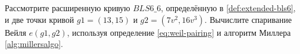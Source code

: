 \begin{exercise}
\label{ex:generator-pairing}
Рассмотрите расширенную кривую $BLS6\_6$, определённую в \ref{def:extended-bls6}, и две точки кривой $g1=(13,15)$ и $g2=(7v^2,16v^3)$. Вычислите спаривание Вейля 
$e(g1,g2)$, используя определение \ref{eq:weil-pairing} и алгоритм Миллера \ref{alg:millersalgo}.
\end{exercise}

